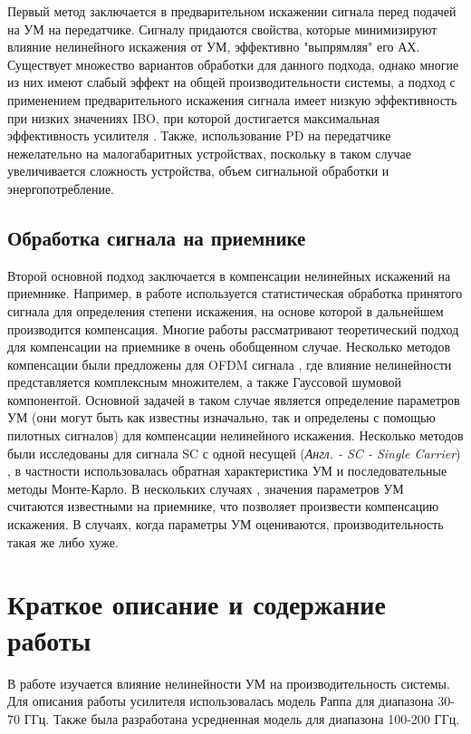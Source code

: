 \documentclass{unn}
\begin{document}
Первый метод заключается в предварительном искажении сигнала перед
подачей на УМ на передатчике. Сигналу придаются свойства, которые
минимизируют влияние нелинейного искажения от УМ, эффективно "выпрямляя"
его АХ. Существует множество вариантов обработки для данного подхода,
однако многие из них имеют слабый эффект на общей производительности
системы, а подход с применением предварительного искажения сигнала имеет
низкую эффективность при низких значениях IBO, при которой достигается
максимальная эффективность усилителя \cite{sharath2015}
\cite{shabany2008} \cite{eda2001}. Также, использование PD на передатчике
нежелательно на малогабаритных устройствах, поскольку в таком случае
увеличивается сложность устройства, объем сигнальной обработки и энергопотребление.

\subsection{Обработка сигнала на приемнике}

Второй основной подход заключается в компенсации нелинейных искажений на
приемнике. Например, в работе \cite{maltsev2021} используется
статистическая обработка принятого сигнала для определения степени
искажения, на основе которой в дальнейшем производится компенсация. Многие
работы \cite[]{sharath2015, shabany2008,bhat2016,qi2010,gregorio2007,
bouhadda2015,drotar2010} рассматривают теоретический подход для компенсации
на приемнике в очень обобщенном случае. Несколько методов компенсации были
предложены для OFDM сигнала \cite[]{gregorio2007,bouhadda2015, drotar2010},
где влияние нелинейности представляется комплексным множителем, а также
Гауссовой шумовой компонентой. Основной задачей в таком случае является
определение параметров УМ (они могут быть как известны изначально, так и
определены с помощью пилотных сигналов) для компенсации нелинейного
искажения. Несколько методов были исследованы для сигнала SC с одной несущей
(\textit{Англ. - SC - Single Carrier}) \cite[]{sharath2015,
shabany2008,bhat2016, qi2010}, в частности использовалась обратная
характеристика УМ и последовательные методы Монте-Карло. В нескольких
случаях \cite[]{bhat2016, qi2010,gregorio2007}, значения параметров УМ
считаются известными на приемнике, что позволяет произвести компенсацию
искажения. В случаях, когда параметры УМ оцениваются, производительность
такая же либо хуже.

\section{Краткое описание и содержание работы}
В работе изучается влияние нелинейности УМ на производительность
системы. Для описания работы усилителя использовалась модель Раппа для
диапазона 30-70 ГГц. Также была разработана усредненная модель для
диапазона 100-200 ГГц. 
\end{document}
